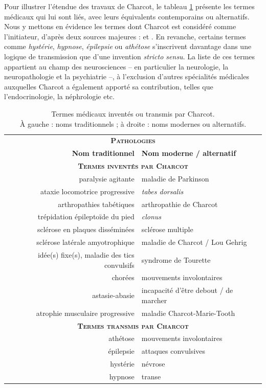 Pour illustrer l'étendue des travaux de Charcot, le tableau \ref{tab:contributions_charcot} présente les termes médicaux qui lui sont liés, avec leurs équivalents contemporains ou alternatifs. Nous y mettons en évidence les termes dont Charcot est considéré comme l'initiateur, d'après deux sources majeures : \citet{walusinski} et \citet{camargo2024}. En revanche, certains termes comme \textit{hystérie}, \textit{hypnose}, \textit{épilepsie} ou \textit{athétose} s'inscrivent davantage dans une logique de transmission que d'une invention \textit{stricto sensu}. La liste de ces termes appartient au champ des neurosciences -- en particulier la neurologie, la neuropathologie et la psychiatrie --, à l'exclusion d'autres spécialités médicales auxquelles Charcot a également apporté sa contribution, telles que l'endocrinologie, la néphrologie etc.

\begin{table}[h]
	\centering
	\begin{tabular}{rl}
		\hline\hline
		\multicolumn{2}{c}{\textbf{\textsc{Pathologies}}} \\
		\textbf{Nom traditionnel} & \textbf{Nom moderne / alternatif} \\
		\multicolumn{2}{c}{\textbf{\textsc{Termes inventés par Charcot}}} \\
		\hline
		paralysie agitante & maladie de Parkinson\\
		ataxie locomotrice progressive & \textit{tabes dorsalis}\\
		arthropathies tabétiques & arthropathie de Charcot\\
		trépidation épileptoïde du pied & \textit{clonus}\\
		sclérose en plaques disséminées & sclérose multiple\\
		sclérose latérale amyotrophique & maladie de Charcot / Lou Gehrig\\
		idée(s) fixe(s), maladie des tics convulsifs & syndrome de Tourette\\
		chorées & mouvements involontaires\\
		astasie-abasie & incapacité d'être debout / de marcher\\
		atrophie musculaire progressive & maladie Charcot-Marie-Tooth\\
		\hline
		\multicolumn{2}{c}{\textbf{\textsc{Termes transmis par Charcot}}} \\
		athétose & mouvements involontaires\\
		épilepsie & attaques convulsives \\
		hystérie & névrose \\
		hypnose & transe \\
		\hline\hline
	\end{tabular}
	\caption{Termes médicaux inventés ou transmis par Charcot. \\
		À gauche : noms traditionnels ; à droite : noms modernes ou alternatifs.}
	\label{tab:contributions_charcot}
\end{table}

